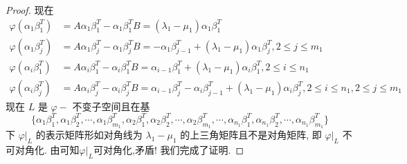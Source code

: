 \documentclass[../../main.tex]{subfiles}
\begin{document}
\begin{proof}
现在
\begin{align*}
\varphi(\alpha_1 \beta_1^T) &= A\alpha_1 \beta_1^T - \alpha_1 \beta_1^T B = (\lambda_1 - \mu_1) \alpha_1 \beta_1^T \\
\varphi(\alpha_1 \beta_j^T) &= A\alpha_1 \beta_j^T - \alpha_1 \beta_j^T B = -\alpha_1 \beta_{j - 1}^T + (\lambda_1 - \mu_1) \alpha_1 \beta_j^T, 2 \leqslant  j \leqslant  m_1 \\
\varphi(\alpha_i \beta_1^T) &= A\alpha_i \beta_1^T - \alpha_i \beta_1^T B = \alpha_{i - 1} \beta_1^T + (\lambda_1 - \mu_1) \alpha_i \beta_1^T, 2 \leqslant  i \leqslant  n_1 \\
\varphi(\alpha_i \beta_j^T) &= A\alpha_i \beta_j^T - \alpha_i \beta_j^T B = \alpha_{i - 1} \beta_j^T - \alpha_i \beta_{j - 1}^T + (\lambda_1 - \mu_1) \alpha_i \beta_j^T, 2 \leqslant  i \leqslant  n_1, 2 \leqslant  j \leqslant  m_1
\end{align*}
现在 $L$ 是 $\varphi-$ 不变子空间且在基
$$\{\alpha_1 \beta_1^T, \alpha_1 \beta_2^T, \cdots, \alpha_1 \beta_{m_1}^T, \alpha_2 \beta_1^T, \alpha_2 \beta_2^T, \cdots, \alpha_2 \beta_{m_1}^T, \cdots, \alpha_{n_1} \beta_1^T, \alpha_{n_1} \beta_2^T, \cdots, \alpha_{n_1} \beta_{m_1}^T\}$$
下 $\varphi|_L$ 的表示矩阵形如对角线为 $\lambda_1 - \mu_1$ 的上三角矩阵且不是对角矩阵, 即 $\varphi|_L$ 不可对角化. 由可知$\varphi|_L$可对角化,矛盾!
我们完成了证明.
\end{proof}
\end{document}
